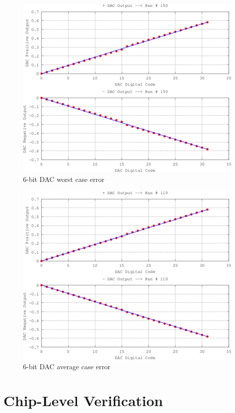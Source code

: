 \documentclass[12pt,oneside,final]{siuethesis}
\theoremstyle{definition}
\begin{document}
\begin{figure}[htbp!]
 \centering
 \includegraphics[scale=.31]{./ch4_figures/dnl_worst.png}
 \caption{6-bit DAC worst case error}
 \label{fig:dac-worst}
\end{figure} 

\begin{figure}[htbp!]
 \centering
 \includegraphics[scale=.31]{./ch4_figures/dac_average.png}
 \caption{6-bit DAC average case error}
 \label{fig:dac-average}
\end{figure} 

\section{Chip-Level Verification}
\end{document}

